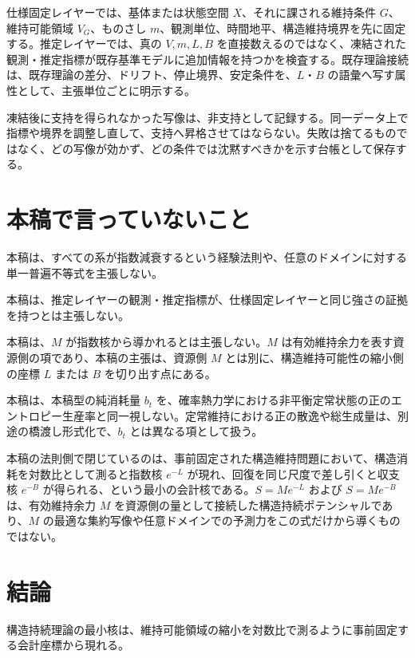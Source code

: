 \documentclass[12pt,a4paper]{article}
\begin{document}
仕様固定レイヤーでは、基体または状態空間 \(X\)、それに課される維持条件 \(G\)、維持可能領域 \(V_{G}\)、ものさし \(m\)、観測単位、時間地平、構造維持境界を先に固定する。推定レイヤーでは、真の \(V,m,L,B\) を直接数えるのではなく、凍結された観測・推定指標が既存基準モデルに追加情報を持つかを検査する。既存理論接続は、既存理論の差分、ドリフト、停止境界、安定条件を、\(L\)・\(B\) の語彙へ写す属性として、主張単位ごとに明示する。

凍結後に支持を得られなかった写像は、非支持として記録する。同一データ上で指標や境界を調整し直して、支持へ昇格させてはならない。失敗は捨てるものではなく、どの写像が効かず、どの条件では沈黙すべきかを示す台帳として保存する。

\section{本稿で言っていないこと}\label{ux672cux7a3fux3067ux8a00ux3063ux3066ux3044ux306aux3044ux3053ux3068}

本稿は、すべての系が指数減衰するという経験法則や、任意のドメインに対する単一普遍不等式を主張しない。

本稿は、推定レイヤーの観測・推定指標が、仕様固定レイヤーと同じ強さの証拠を持つとは主張しない。

本稿は、\(M\) が指数核から導かれるとは主張しない。\(M\) は有効維持余力を表す資源側の項であり、本稿の主張は、資源側 \(M\) とは別に、構造維持可能性の縮小側の座標 \(L\) または \(B\) を切り出す点にある。

本稿は、本稿型の純消耗量 \(b_{t}\) を、確率熱力学における非平衡定常状態の正のエントロピー生産率と同一視しない。定常維持における正の散逸や総生成量は、別途の橋渡し形式化で、\(b_{t}\) とは異なる項として扱う。

本稿の法則側で閉じているのは、事前固定された構造維持問題において、構造消耗を対数比として測ると指数核 \(e^{-L}\) が現れ、回復を同じ尺度で差し引くと収支核 \(e^{-B}\) が得られる、という最小の会計核である。\(S=Me^{-L}\) および \(S=Me^{-B}\) は、有効維持余力 \(M\) を資源側の量として接続した構造持続ポテンシャルであり、\(M\) の最適な集約写像や任意ドメインでの予測力をこの式だけから導くものではない。

\section{結論}\label{ux7d50ux8ad6}

構造持続理論の最小核は、維持可能領域の縮小を対数比で測るように事前固定する会計座標から現れる。
\end{document}
